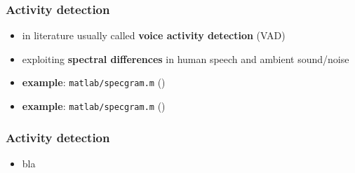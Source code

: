 \begin{frame} %
	\frametitle{Activity detection}
	\begin{itemize}
		\item in literature usually called \textbf{voice activity detection} (VAD)
		\item exploiting \textbf{spectral differences} in human speech and ambient sound/noise
		\item \textbf{example}: \texttt{matlab/specgram.m} ()
			\begin{figure}
				\centering
				\begin{subfigure}[c]{0.40\linewidth}
				\end{subfigure}
				\hspace{0.01\linewidth}
				\begin{subfigure}[c]{0.40\linewidth}
				\end{subfigure}
			\end{figure}
		\item \textbf{example}: \texttt{matlab/specgram.m} ()
			\begin{figure}
				\centering
				\begin{subfigure}[c]{0.40\linewidth}
				\end{subfigure}
				\hspace{0.01\linewidth}
				\begin{subfigure}[c]{0.40\linewidth}
				\end{subfigure}
			\end{figure}
	\end{itemize}
\end{frame}

\begin{frame} %
	\frametitle{Activity detection}
	\begin{itemize}
		\item bla
	\end{itemize}
\end{frame}
